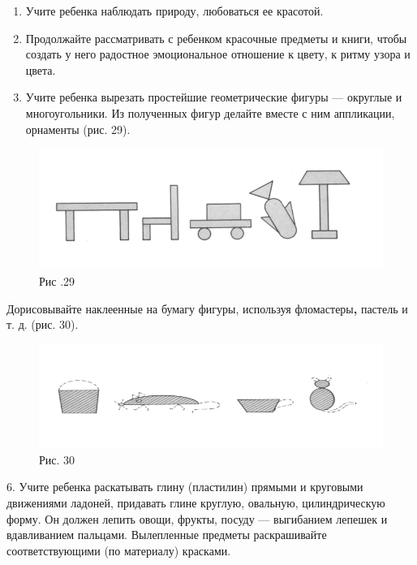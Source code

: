 \documentclass{book}
\begin{document}
\begin{enumerate}
\def\labelenumi{\arabic{enumi}.}
\setcounter{enumi}{2}
\item
  
  Учите ребенка наблюдать природу, любоваться ее красотой.
  
\item
  
  Продолжайте рассматривать с ребенком красочные предметы и книги, чтобы
  создать у него радостное эмоциональное отношение к цвету, к ритму
  узора и цвета.
  
\item
  
  Учите ребенка вырезать простейшие геометрические фигуры --- округлые и
  многоугольники. Из полученных фигур делайте вместе с ним аппликации,
  орнаменты (рис. 29).
  
\end{enumerate}


\begin{figure}
\centering
\includegraphics[width=\linewidth]{media/media/image26.png}
\caption*{Рис .29}
\end{figure}

Дорисовывайте наклеенные на бумагу фигуры, используя
фломастеры\textbf{,} пастель и т. д. (рис. 30).

\begin{figure}
\centering
\includegraphics[width=\linewidth]{media/media/image27.png}
\caption*{Рис. 30}
\end{figure}

6. Учите ребенка раскатывать глину (пластилин) прямыми и круговыми
движениями ладоней, придавать глине круглую, овальную, цилиндрическую
форму. Он должен лепить овощи, фрукты, посуду --- выгибанием лепешек и
вдавливанием пальцами. Вылепленные предметы раскрашивайте
соответствующими (по материалу) красками.
\end{document}

